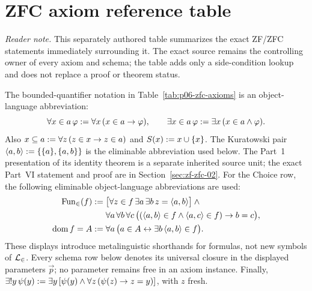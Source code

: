 
\section*{ZFC axiom reference table}
\noindent\textit{Reader note.}  This separately authored table summarizes the
exact ZF/ZFC statements immediately surrounding it.  The exact source remains
the controlling owner of every axiom and schema; the table adds only a
side-condition lookup and does not replace a proof or theorem status.

The bounded-quantifier notation in Table~\ref{tab:p06-zfc-axioms} is an
object-language abbreviation:
\[
 \forall x\in a\,\varphi\mathrel{:=}\forall x\,(x\in a\to\varphi),
 \qquad
 \exists x\in a\,\varphi\mathrel{:=}\exists x\,(x\in a\land\varphi).
\]
Also
\(x\subseteq a\mathrel{:=}\forall z\,(z\in x\to z\in a)\) and
\(S(x)\mathrel{:=} x\cup\{x\}\).  The Kuratowski pair
\(\langle a,b\rangle\mathrel{:=}\{\{a\},\{a,b\}\}\) is the eliminable abbreviation
used below.  The Part~1 presentation of its identity theorem is a separate
inherited source unit; the exact Part~VI statement and proof are in
Section~\ref{sec:zf-zfc-02}.  For the Choice row, the
following eliminable object-language abbreviations are used:
\[
\begin{aligned}
 \operatorname{Fun}_{\in}(f)\mathrel{:=}{}&
   \bigl[\forall z\in f\,\exists a\,\exists b\,
          z=\langle a,b\rangle\bigr]\land{}\\
 &\forall a\,\forall b\,\forall c\,
   \bigl((\langle a,b\rangle\in f\land
          \langle a,c\rangle\in f)\to b=c\bigr),\\
 \operatorname{dom} f=A\mathrel{:=}{}&
   \forall a\,
   \bigl(a\in A\leftrightarrow
         \exists b\,\langle a,b\rangle\in f\bigr).
\end{aligned}
\]
These displays introduce metalinguistic shorthands for formulas, not new
symbols of \(\mathcal{L}_{\in}\).  Every schema row below denotes its universal
closure in the displayed parameters \(\vec p\); no parameter remains free in
an axiom instance.  Finally,
\(\exists!y\,\psi(y)\mathrel{:=}
\exists y\,[\psi(y)\land\forall z\,(\psi(z)\to z=y)]\), with \(z\) fresh.

